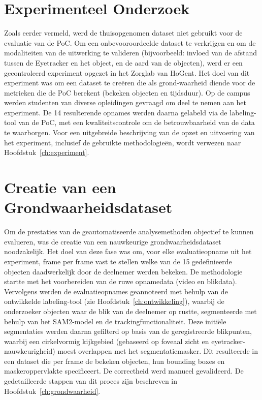 \section{Experimenteel Onderzoek}

Zoals eerder vermeld, werd de thuisopgenomen dataset niet gebruikt voor de evaluatie van de PoC. 
Om een onbevooroordeelde dataset te verkrijgen en om de modaliteiten van de uitwerking te valideren (bijvoorbeeld: invloed van de afstand tussen de Eyetracker en het object, en de aard van de objecten), werd er een gecontroleerd experiment opgezet in het Zorglab van HoGent.
Het doel van dit experiment was om een dataset te creëren die als grond-waarheid diende voor de metrieken die de PoC berekent (bekeken objecten en tijdsduur).
Op de campus werden studenten van diverse opleidingen gevraagd om deel te nemen aan het experiment.
De 14 resulterende opnames werden daarna gelabeld via de labeling-tool van de PoC, met een kwaliteitscontrole om de betrouwbaarheid van de data te waarborgen.
Voor een uitgebreide beschrijving van de opzet en uitvoering van het experiment, inclusief de gebruikte methodologieën, wordt verwezen naar Hoofdstuk~\ref{ch:experiment}.

\section{Creatie van een Grondwaarheidsdataset}

Om de prestaties van de geautomatiseerde analysemethoden objectief te kunnen evalueren, was de creatie van een nauwkeurige 
grondwaarheidsdataset noodzakelijk. Het doel van deze fase was om, voor elke evaluatieopname uit het experiment, 
frame per frame vast te stellen welke van de 15 gedefinieerde objecten daadwerkelijk door de deelnemer werden bekeken. 
De methodologie startte met het voorbereiden van de ruwe opnamedata (video en blikdata). 
Vervolgens werden de evaluatieopnames geannoteerd met behulp van de ontwikkelde labeling-tool (zie Hoofdstuk~\ref{ch:ontwikkeling}), 
waarbij de onderzoeker objecten waar de blik van de deelnemer op rustte, segmenteerde met behulp van het SAM2-model en de trackingfunctionaliteit. 
Deze initiële segmentaties werden daarna gefilterd op basis van de geregistreerde blikpunten, waarbij een cirkelvormig kijkgebied 
(gebaseerd op foveaal zicht en eyetracker-nauwkeurigheid) moest overlappen met het segmentatiemasker. 
Dit resulteerde in een dataset die per frame de bekeken objecten, hun bounding boxes en maskeroppervlakte specificeert. 
De correctheid werd manueel gevalideerd. De gedetailleerde stappen van dit proces zijn beschreven in Hoofdstuk~\ref{ch:grondwaarheid}.

